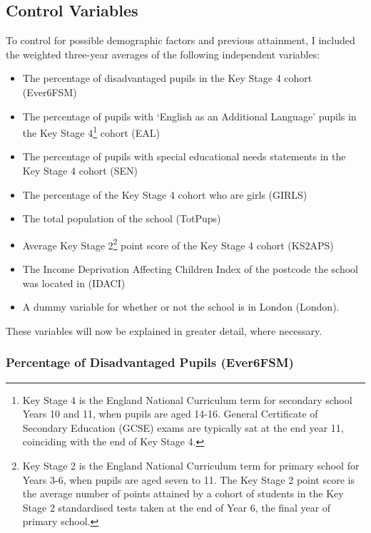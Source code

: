 \documentclass[12pt, a4paper]{article}
\begin{document}
\subsection{Control Variables}

To control for possible demographic factors and previous attainment, I included the weighted three-year averages of the following independent variables:

\begin{itemize}
\item The percentage of disadvantaged pupils in the Key Stage 4 cohort (Ever6FSM)
\item The percentage of pupils with `English as an Additional Language' pupils in the Key Stage 4\footnote{Key Stage 4 is the England National Curriculum term for secondary school Years 10 and 11, when pupils are aged 14-16. General Certificate of Secondary Education (GCSE) exams are typically sat at the end year 11, coinciding with the end of Key Stage 4.} cohort (EAL)
\item The percentage of pupils with special educational needs statements in the Key Stage 4 cohort (SEN)
\item The percentage of the Key Stage 4 cohort who are girls (GIRLS)
\item The total population of the school (TotPups)
\item Average Key Stage 2\footnote{Key Stage 2 is the England National Curriculum term for primary school for Years 3-6, when pupils are aged seven to 11. The Key Stage 2 point score is the average number of points attained by a cohort of students in the Key Stage 2 standardised tests taken at the end of Year 6, the final year of primary school.} point score of the Key Stage 4 cohort (KS2APS)
\item The Income Deprivation Affecting Children Index of the postcode the school was located in (IDACI)
\item A dummy variable for whether or not the school is in London (London).
\end{itemize}

These variables will now be explained in greater detail, where necessary.

\subsubsection{Percentage of Disadvantaged Pupils (Ever6FSM)}
\end{document}
